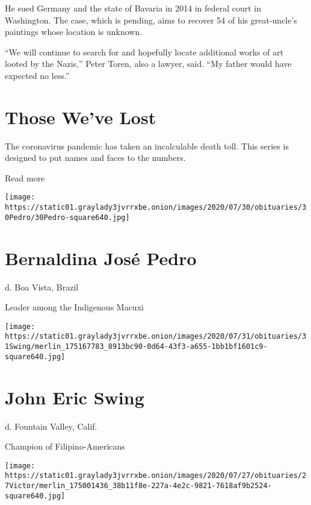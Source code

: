 He sued Germany and the state of Bavaria in 2014 in federal court in
Washington. The case, which is pending, aims to recover 54 of his
great-uncle's paintings whose location is unknown.

``We will continue to search for and hopefully locate additional works
of art looted by the Nazis,'' Peter Toren, also a lawyer, said. ``My
father would have expected no less.''

\href{https://www.nytimes3xbfgragh.onion/interactive/2020/obituaries/people-died-coronavirus-obituaries.html?action=click\&pgtype=Article\&state=default\&region=BELOW_MAIN_CONTENT\&context=covid_obits_promo}{}

\hypertarget{those-weve-lost}{%
\section{Those We've Lost}\label{those-weve-lost}}

The coronavirus pandemic has taken an incalculable death toll. This
series is designed to put names and faces to the numbers.

Read more

\texttt{[image: https://static01.graylady3jvrrxbe.onion/images/2020/07/30/obituaries/30Pedro/30Pedro-square640.jpg]}

\hypertarget{bernaldina-josuxe9-pedro}{%
\section{Bernaldina José Pedro}\label{bernaldina-josuxe9-pedro}}

d. Boa Vista, Brazil

Leader among the Indigenous Macuxi

\texttt{[image: https://static01.graylady3jvrrxbe.onion/images/2020/07/31/obituaries/31Swing/merlin\_175167783\_8913bc90-0d64-43f3-a655-1bb1bf1601c9-square640.jpg]}

\hypertarget{john-eric-swing}{%
\section{John Eric Swing}\label{john-eric-swing}}

d. Fountain Valley, Calif.

Champion of Filipino-Americans

\texttt{[image: https://static01.graylady3jvrrxbe.onion/images/2020/07/27/obituaries/27Victor/merlin\_175001436\_38b11f8e-227a-4e2c-9821-7618af9b2524-square640.jpg]}

